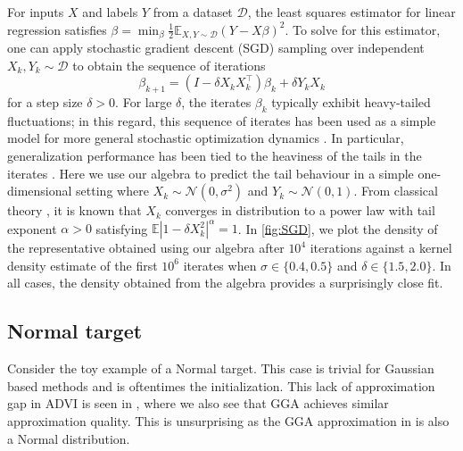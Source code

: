 \documentclass[../thesis.tex]{subfiles}
\begin{document}
For inputs $X$ and labels $Y$ from a dataset $\mathcal{D}$, the least squares estimator for linear regression satisfies $\beta = \min_\beta \tfrac12 \mathbb{E}_{X,Y\sim\mathcal{D}}(Y - X\beta)^2$. To solve for this estimator, one can apply stochastic gradient descent (SGD) sampling over independent $X_k,Y_k\sim \mathcal{D}$ to obtain the sequence of iterations
\[
  \beta_{k+1} = (I - \delta X_k X_k^\top) \beta_k + \delta Y_k X_k
\]
for a step size $\delta > 0$. For large $\delta$, the iterates $\beta_k$ typically exhibit heavy-tailed fluctuations; in this regard, this sequence of iterates has been used as a simple model for more general stochastic optimization dynamics \citep{gurbuzbalaban2021heavy,hodgkinson2021multiplicative}. In particular, generalization performance has been tied to the heaviness of the tails in the iterates \cite{simsekli2019tail}. Here we use our algebra to predict the tail behaviour in a simple one-dimensional setting where $X_k \sim \mathcal{N}(0,\sigma^2)$ and $Y_k \sim \mathcal{N}(0,1)$. From classical theory \citep{buraczewski2016stochastic}, it is known that $X_k$ converges in distribution to a power law with tail exponent $\alpha > 0$ satisfying $\mathbb{E}|1 - \delta X_k^2|^\alpha = 1$. In \cref{fig:SGD}, we plot the density of the representative obtained using our algebra after $10^4$ iterations against a kernel density estimate of the first $10^6$ iterates when $\sigma \in \{0.4,0.5\}$ and $\delta \in \{1.5,2.0\}$. In all cases, the density obtained from the algebra provides a surprisingly close fit.



\subsection{Normal target}

Consider the toy example of a Normal target. This case is trivial for
Gaussian based methods and is oftentimes the initialization.
This lack of approximation gap in ADVI is seen in ,
where we also see that GGA achieves similar approximation quality.
This is unsurprising as the GGA approximation in 
is also a Normal distribution.
\end{document}
